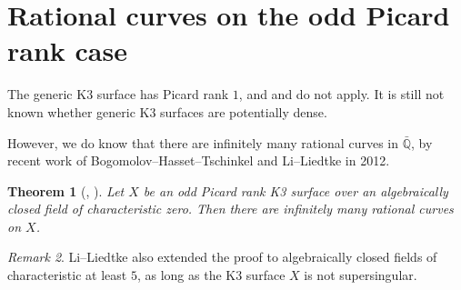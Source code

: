 \documentclass{amsart}
\theoremstyle{plain}
\newtheorem{theorem}{Theorem}[section]
\theoremstyle{definition}
\theoremstyle{remark}
\newtheorem{remark}[theorem]{Remark}
\begin{document}

\section{Rational curves on the odd Picard rank case} %
\label{sec:rational_curves_on_the_odd_picard_rank_case}

The generic K3 surface has Picard rank $1$, and  and 
 do not apply. It is still not known whether 
generic K3 surfaces are potentially dense.

However, we do know that there are infinitely many rational curves in $\bar{\mathbb{Q}}$,
by recent work of Bogomolov--Hasset--Tschinkel and Li--Liedtke in 2012.
\begin{theorem}[\cite{BHT}, \cite{LL}]
Let $X$ be an odd Picard rank K3 surface over an algebraically closed field of characteristic zero.
Then there are infinitely many rational curves on $X$.
\end{theorem}
\begin{remark}
Li--Liedtke also extended the proof to algebraically closed fields of characteristic at least $5$, as
long as the K3 surface $X$ is not supersingular.
\end{remark}
\end{document}
